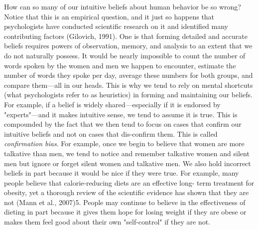 
How can so many of our intuitive beliefs about human behavior be so wrong? Notice that this is an empirical question, and it just so happens that psychologists have conducted scientific research on it and identified many contributing factors (Gilovich, 1991). One is that forming detailed and accurate beliefs requires powers of observation, memory, and analysis to an extent that we do not naturally possess. It would be nearly impossible to count the number of words spoken by the women and men we happen to encounter, estimate the number of words they spoke per day, average these numbers for both groups, and compare them---all in our heads. This is why we tend to rely on mental shortcuts (what psychologists refer to as heuristics) in forming and maintaining our beliefs. For example, if a belief is widely shared---especially if it is endorsed by "experts"---and it makes intuitive sense, we tend to assume it is true. This is compounded by the fact that we then tend to focus on cases that confirm our intuitive beliefs and not on cases that dis-confirm them. This is called \emph{confirmation bias}. For example, once we begin to believe that women are more talkative than men, we tend to notice and remember talkative women and silent men but ignore or forget silent women and talkative men. We also hold incorrect beliefs in part because it would be nice if they were true. For example, many people believe that calorie-reducing diets are an effective long- term treatment for obesity, yet a thorough review of the scientific evidence has shown that they are not (Mann et al., 2007)5. People may continue to believe in the effectiveness of dieting in part because it gives them hope for losing weight if they are obese or makes them feel good about their own "self-control" if they are not.

